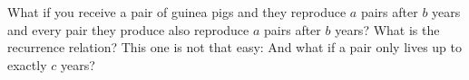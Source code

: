 \starprob
What if you receive a pair of guinea pigs and they reproduce
$a$ pairs after $b$ years and every pair they produce also reproduce $a$ pairs after $b$ years?
What is the recurrence relation?
This one is not that easy: And what if a pair only lives up to exactly $c$ years?
